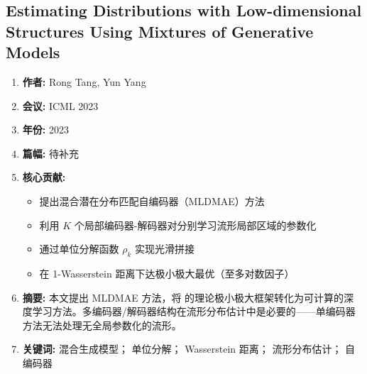 \subsection{Estimating Distributions with Low-dimensional Structures Using Mixtures of Generative Models}
\begin{enumerate}
    \item \textbf{作者:} Rong Tang, Yun Yang
    \item \textbf{会议:} ICML 2023
    \item \textbf{年份:} 2023
    \item \textbf{篇幅:} 待补充
    \item \textbf{核心贡献:}
        \begin{itemize}
            \item 提出混合潜在分布匹配自编码器（MLDMAE）方法
            \item 利用 $K$ 个局部编码器-解码器对分别学习流形局部区域的参数化
            \item 通过单位分解函数 $\rho_k$ 实现光滑拼接
            \item 在 1-Wasserstein 距离下达极小极大最优（至多对数因子）
        \end{itemize}
    \item \textbf{摘要:} 本文提出 MLDMAE 方法，将 \citep{tang2022minimax} 的理论极小极大框架转化为可计算的深度学习方法。多编码器/解码器结构在流形分布估计中是必要的——单编码器方法无法处理无全局参数化的流形。
    \item \textbf{关键词:} 混合生成模型； 单位分解； Wasserstein 距离； 流形分布估计； 自编码器
\end{enumerate}

